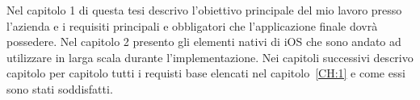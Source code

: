 Nel capitolo 1 di questa tesi descrivo l'obiettivo principale del mio lavoro presso l'azienda e
i requisiti principali e obbligatori che l'applicazione finale dovrà possedere.
Nel capitolo 2 presento gli elementi nativi di iOS che sono andato ad utilizzare in larga scala
durante l'implementazione. Nei capitoli successivi descrivo capitolo per capitolo tutti i requisti
base elencati nel capitolo~\ref{CH:1} e come essi sono stati soddisfatti.